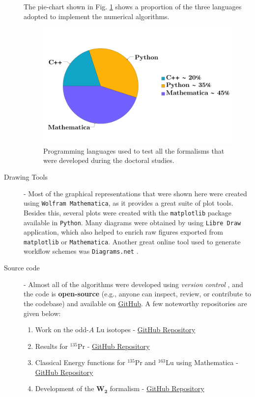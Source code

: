 \begin{description}
\begin{enumerate}
    \end{enumerate}
    The pie-chart shown in Fig. \ref{programming-languages-model} shows a proportion of the three languages adopted to implement the numerical algorithms. 
        \begin{figure}
            \centering
            \includegraphics[scale=0.85]{Chapters/Figures/pieChartLanguages.pdf}
            \caption{Programming languages used to test all the formalisms that were developed during the doctoral studies.}
            \label{programming-languages-model}
        \end{figure} 
    \item[Drawing Tools] - Most of the graphical representations that were shown here were created using \texttt{Wolfram Mathematica}, as it provides a great suite of plot tools. Besides this, several plots were created with the \texttt{matplotlib} package \cite{Matplotlib} available in \texttt{Python}. Many diagrams were obtained by using \texttt{Libre Draw} \cite{LibreOffice} application, which also helped to enrich raw figures exported from \texttt{matplotlib} or \texttt{Mathematica}. Another great online tool used to generate workflow schemes was \texttt{Diagrams.net} \cite{diagrams.net}.
    \item[Source code] - Almost all of the algorithms were developed using \emph{version control} \cite{Git}, and the code is \textbf{open-source} (e.g., anyone can inspect, review, or contribute to the codebase) and available on \href{https://github.com/}{GitHub}. A few noteworthy repositories are given below:
    \begin{enumerate}
        \item Work on the odd-$A$ Lu isotopes - \href{https://github.com/basavyr/163Lu-New-TSD4-Formalism}{GitHub Repository}
        \item Results for $^{135}$Pr - \href{https://github.com/basavyr/pr135_EnergyFit_TW1TW2}{GitHub Repository}
        \item Classical Energy functions for $^{135}$Pr and $^{163}$Lu using Mathematica - \href{https://github.com/basavyr/mathematica-useful-algorithms}{GitHub Repository}
        \item Development of the $\mathbf{W_2}$ formalism - \href{https://github.com/basavyr/SymmetryPartners-RJP}{GitHub Repository}
    \end{enumerate}
\end{description}


